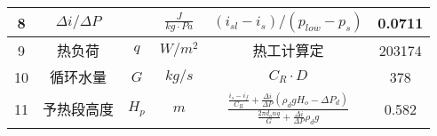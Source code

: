 \begin{table}[H]
{\begin{tabular}{|c|c|c|c|c|c|}
            8    & $ \Delta i / \Delta P $     &             & $ \frac{J}{kg \cdot Pa} $ & $ (i_{sl} - i_{s}) / (p_{low} - p_{s}) $                                                                                                                                 & 0.0711           \\ \hline
            9    & 热负荷                      & $ q $       & $ W/m^{2} $               & 热工计算定                                                                                                                                                               & 203174           \\ \hline
            10   & 循环水量                    & $ G $       & $ kg/s $                  & $ C_R \cdot D $                                                                                                                                                          & 378              \\ \hline
            11   & 予热段高度                  & $ H_p $     & $ m $                     & $ \frac{\frac{i_{s}-i_{f}}{C_{R}}+\frac{\Delta i}{\Delta P}\left(\rho_{d} g H_{o}-\Delta P_{d}\right)}{\frac{2 \pi d_{o} n q}{G}+\frac{\Delta i}{\Delta P} \rho_{d} g} $ & 0.582            \\ \hline
        \end{tabular}
    }
\end{table}

